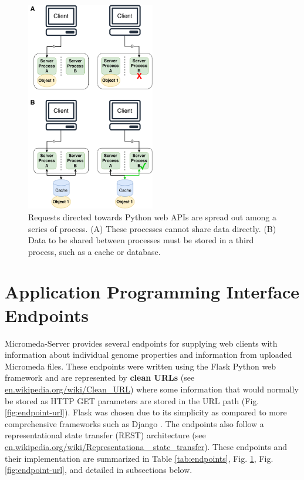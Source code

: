 \begin{figure}[!ht]
  \centering
	\includegraphics[width=0.50\textwidth]{media/Client-Processing.pdf}
	 \caption{Requests directed towards Python web APIs are spread out among a series of process. (A) These processes cannot share data directly. (B) Data to be shared between processes must be stored in a third process, such as a cache or database.}
	 \label{fig:client-processing}
\end{figure}

\section{Application Programming Interface Endpoints} \label{endpoints}

Micromeda-Server provides several endpoints for supplying web clients with information about individual genome properties and information from uploaded Micromeda files. These endpoints were written using the Flask Python web framework \cite{grinberg2018flask} and are represented by \textbf{clean URLs} (see \href{en.wikipedia.org/wiki/Clean\_URL}{en.wikipedia.org/wiki/Clean\_URL}) where some information that would normally be stored as HTTP GET parameters are stored in the URL path (Fig. \ref{fig:endpoint-url}). Flask was chosen due to its simplicity as compared to more comprehensive frameworks such as Django \cite{holovaty2009definitive}. The endpoints also follow a representational state transfer (REST) architecture \cite{fielding2000representational} (see \href{en.wikipedia.org/wiki/Representational\_state\_transfer}{en.wikipedia.org/wiki/Representationa \_state\_transfer}). These endpoints and their implementation are summarized in Table \ref{tab:endpoints}, Fig. \ref{endpoints}, Fig. \ref{fig:endpoint-url}, and detailed in subsections below.

